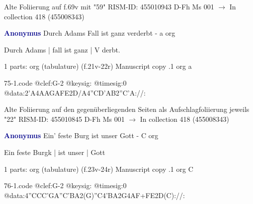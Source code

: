 \documentclass[twocolumn]{book}
\begin{document}
\newline Alte Foliierung auf f.69v mit "59"
\newline RISM-ID: 455010943
\newline D-Fh  Ms 001
\newline $\rightarrow$ In collection 418 (455008343)
      
\newline \par \vspace{7pt} \textcolor{darkblue}{\textbf{Anonymus  }}
\newline Durch Adams Fall ist ganz verderbt - a
\newline org
\newline \begin{itshape}[f.21v, at left:] Durch Adams | fall ist ganz | V derbt.\end{itshape} 
\newline \textcolor{darkblue}{}  1 parts: org (tabulature)  (f.21v-22r)
\newline Manuscript copy
.1  org  a  
\begin{filecontents*}{75-1.code}
@clef:G-2
@keysig:
@timesig:0
@data:2'A4AAGAFE2D/A4''CD'AB2''C'A://:
\end{filecontents*}
\newline
%

\newline Alte Foliierung auf den gegenüberliegenden Seiten als Aufschlagfoliierung jeweils "22"
\newline RISM-ID: 455010845
\newline D-Fh  Ms 001
\newline $\rightarrow$ In collection 418 (455008343)
      
\newline \par \vspace{7pt} \textcolor{darkblue}{\textbf{Anonymus  }}
\newline Ein' feste Burg ist unser Gott - C
\newline org
\newline \begin{itshape}[f.24r, at left:] Ein feste Burgk | ist unser | Gott\end{itshape} 
\newline \textcolor{darkblue}{}  1 parts: org (tabulature)  (f.23v-24r)
\newline Manuscript copy
.1  org  C  
\begin{filecontents*}{76-1.code}
@clef:G-2
@keysig:
@timesig:0
@data:4''CCC'GA''C'BA2(G)''C4'BA2G4AF+FE2D(C)://:
\end{filecontents*}
\newline
%
\end{document}
